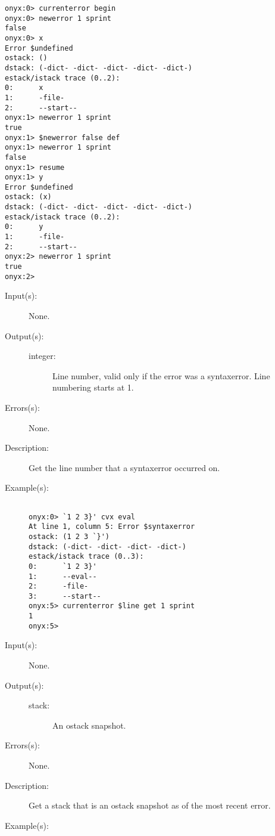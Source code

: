 \begin{description}
\begin{description}
\begin{verbatim}
onyx:0> currenterror begin
onyx:0> newerror 1 sprint
false
onyx:0> x
Error $undefined
ostack: ()
dstack: (-dict- -dict- -dict- -dict- -dict-)
estack/istack trace (0..2):
0:      x
1:      -file-
2:      --start--
onyx:1> newerror 1 sprint
true
onyx:1> $newerror false def
onyx:1> newerror 1 sprint
false
onyx:1> resume
onyx:1> y
Error $undefined
ostack: (x)
dstack: (-dict- -dict- -dict- -dict- -dict-)
estack/istack trace (0..2):
0:      y
1:      -file-
2:      --start--
onyx:2> newerror 1 sprint
true
onyx:2>
		\end{verbatim}
	\end{description}
\label{currenterror:line}
\item[{\onyxop{--}{line}{integer}}: ]
	\begin{description}\item[]
	\item[Input(s): ] None.
	\item[Output(s): ]
		\begin{description}\item[]
		\item[integer: ]
			Line number, valid only if the error was a syntaxerror.
			Line numbering starts at 1.
		\end{description}
	\item[Errors(s): ] None.
	\item[Description: ]
		Get the line number that a syntaxerror occurred on.
	\item[Example(s): ]\begin{verbatim}

onyx:0> `1 2 3}' cvx eval
At line 1, column 5: Error $syntaxerror
ostack: (1 2 3 `}')
dstack: (-dict- -dict- -dict- -dict-)
estack/istack trace (0..3):
0:      `1 2 3}'
1:      --eval--
2:      -file-
3:      --start--
onyx:5> currenterror $line get 1 sprint
1
onyx:5>
		\end{verbatim}
	\end{description}
\label{currenterror:ostack}
\item[{\onyxop{--}{ostack}{stack}}: ]
	\begin{description}\item[]
	\item[Input(s): ] None.
	\item[Output(s): ]
		\begin{description}\item[]
		\item[stack: ]
			An ostack snapshot.
		\end{description}
	\item[Errors(s): ] None.
	\item[Description: ]
		Get a stack that is an ostack snapshot as of the most recent
		error.
	\item[Example(s): ]\begin{verbatim}


\end{verbatim}
\end{description}
\end{description}
